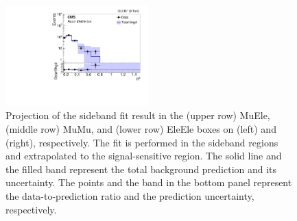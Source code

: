 \begin{figure}[tb!]
\includegraphics[width=0.49\textwidth]{figs/analysis8TeV/RSQ_ElectronHad-Run2012ABCD_Sideband_EleEle.pdf}
\caption{Projection of the sideband fit result in the (upper row) MuEle, (middle row)
  MuMu, and (lower row) EleEle boxes on \MR (left) and
   \Rtwo (right), respectively. The fit is performed
  in the sideband regions and extrapolated to the signal-sensitive
  region. The solid line and the filled band represent the total
  background prediction and its uncertainty. The points and the band
  in the bottom panel represent the data-to-prediction ratio and the
  prediction uncertainty, respectively.\label{fig:Proj1DDilep}}
\end{figure}

